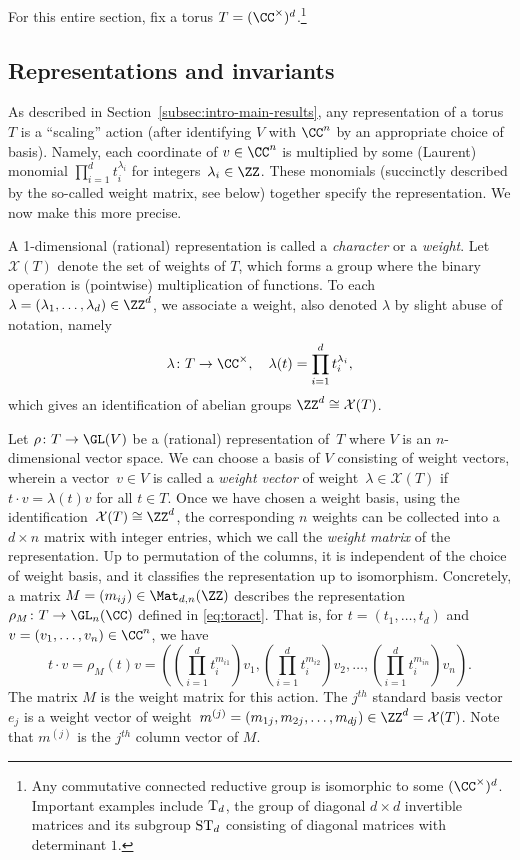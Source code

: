 For this entire section, fix a torus $T = (\CC^\times)^d$.\footnote{Any commutative connected reductive group is isomorphic to some $(\CC^\times)^d$. Important examples include ${\rm T}_d$, the group of diagonal $d \times d$ invertible matrices and its subgroup ${\rm ST}_d$ consisting of diagonal matrices with determinant $1$.}

%
\subsection{Representations and invariants}\label{subsec:rep inv tori}
%
As described in Section~\ref{subsec:intro-main-results}, any representation of a torus~$T$ is a ``scaling'' action
(after identifying $V$ with $\CC^n$ by an appropriate choice of basis).
Namely, each coordinate of $v \in \CC^n$ is multiplied by some (Laurent) monomial $\prod_{i=1}^d t_i^{\lambda_i}$ for integers~$\lambda_i \in \ZZ$.
These monomials (succinctly described by the so-called weight matrix, see below) together specify the representation. 
We now make this more precise.

A 1-dimensional (rational) representation is called a \emph{character} or a \emph{weight}.
Let $\mathcal{X}(T)$ denote the set of weights of $T$, which forms a group where the binary operation is  (pointwise) multiplication of functions.
To each $\lambda = (\lambda_1,\dots,\lambda_d) \in \ZZ^d$, we associate a weight, also denoted $\lambda$ by slight abuse of notation, namely
\[ \lambda\colon T \rightarrow \CC^\times, \quad \lambda(t) = \prod_{i=1}^d t_i^{\lambda_i}, \]
which gives an identification of abelian groups $\ZZ^d \cong \mathcal{X}(T)$.

Let $\rho \colon T \rightarrow \GL(V)$ be a (rational) representation of~$T$ where $V$ is an $n$-dimensional vector space.
We can choose a basis of $V$ consisting of weight vectors, wherein a vector~$v \in V$ is called a \emph{weight vector}
of weight~$\lambda \in \mathcal{X}(T)$ if $t \cdot v = \lambda(t) v$ for all $t \in T$.
Once we have chosen a weight basis, using the identification~$\mathcal{X}(T) \cong \ZZ^d$, the corresponding $n$ weights
can be collected into a $d \times n$ matrix with integer entries, which we call the \emph{weight matrix} of the representation.
Up to permutation of the columns, it is independent of the choice of weight basis, and it classifies the representation up to isomorphism.
Concretely, a matrix $M = (m_{ij}) \in \Mat_{d,n}(\ZZ)$ describes the representation $\rho_M \colon T \rightarrow \GL_n(\CC)$
defined in \eqref{eq:toract}.
That is, for $t = (t_1,\dots,t_d)$ and $v = (v_1,\dots,v_n) \in \CC^n$, we have
\[
 t \cdot v = \rho_M(t) v = \left( \left(\prod_{i=1}^d t_i^{m_{i1}}\right) v_1, \left(\prod_{i=1}^d t_i^{m_{i2}}\right) v_2, \dots, \left(\prod_{i=1}^d t_i^{m_{in}}\right) v_n \right).
\]
The matrix $M$ is the weight matrix for this action.
The $j^{th}$ standard basis vector~$e_j$ is a weight vector of weight~$m^{(j)} = (m_{1j}, m_{2j},\dots, m_{dj}) \in \ZZ^d = \mathcal{X}(T)$.
Note that $m^{(j)}$ is the $j^{th}$ column vector of $M$.

